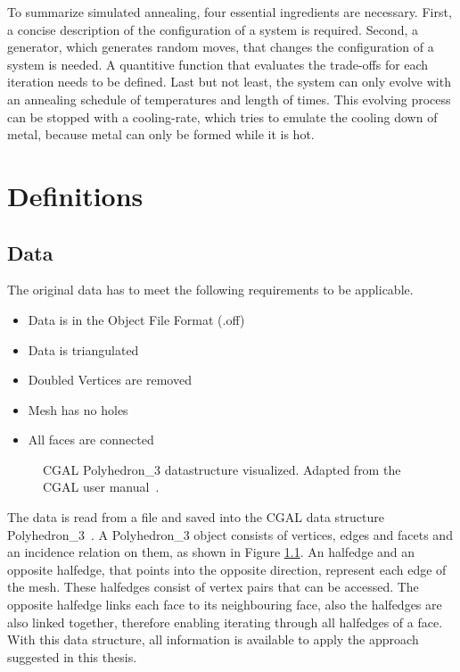 \documentclass[draft,final]{vutinfth} %
\begin{document}
To summarize simulated annealing, four essential ingredients are necessary. First, a concise description of the configuration of a system is required. Second, a generator, which generates random moves, that changes the configuration of a system is needed. A quantitive function that evaluates the trade-offs for each iteration needs to be defined. Last but not least, the system can only evolve with an annealing schedule of temperatures and length of times. This evolving process can be stopped with a cooling-rate, which tries to emulate the cooling down of metal, because metal can only be formed while it is hot.


\chapter{Definitions}
\label{chap:definitions}

\section{Data}

The original data has to meet the following requirements to be applicable.

\begin{itemize}
	\item Data is in the Object File Format (.off)
	\item Data is triangulated
	\item Doubled Vertices are removed
	\item Mesh has no holes
	\item All faces are connected
\end{itemize}

\begin{figure}

\caption{CGAL Polyhedron\_3 datastructure visualized. Adapted from the CGAL user manual~\cite{cgal:eb-19a}.}
\label{fig:cgal}
\end{figure}

The data is read from a file and saved into the CGAL data structure Polyhedron\_3~\cite{cgal:eb-19a}. A Polyhedron\_3 object consists of vertices, edges and facets and an incidence relation on them, as shown in Figure \ref{fig:cgal}. An halfedge and an opposite halfedge, that points into the opposite direction, represent each edge of the mesh. These halfedges consist of vertex pairs that can be accessed. The opposite halfedge links each face to its neighbouring face, also the halfedges are also linked together, therefore enabling iterating through all halfedges of a face. With this data structure, all information is available to apply the approach suggested in this thesis.
\end{document}
